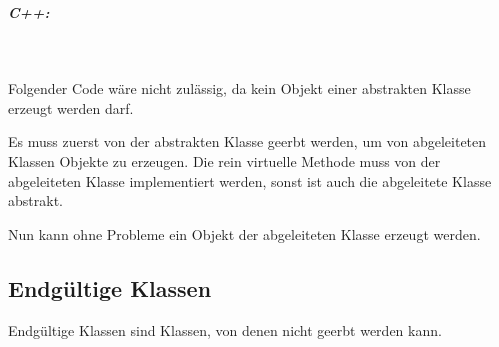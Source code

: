 		\subparagraph*{C++:}\mbox{}\\
			\UseRawInputEncoding{}
			
			Folgender Code wäre nicht zulässig, da kein Objekt einer abstrakten Klasse erzeugt werden darf.
			\UseRawInputEncoding{}
			
			Es muss zuerst von der abstrakten Klasse geerbt werden, um von abgeleiteten Klassen Objekte zu erzeugen. Die rein
			virtuelle Methode muss von der abgeleiteten Klasse implementiert werden, sonst ist auch die abgeleitete Klasse
			abstrakt.
			\UseRawInputEncoding{}
			
			Nun kann ohne Probleme ein Objekt der abgeleiteten Klasse erzeugt werden.
			\UseRawInputEncoding{}
	
	\subsection{Endgültige Klassen}
		Endgültige Klassen sind Klassen, von denen nicht geerbt werden kann.
		\UseRawInputEncoding{}
		\UseRawInputEncoding{}
